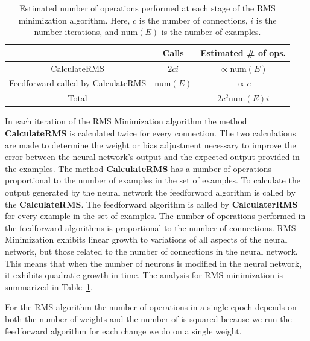 \documentclass[11pt]{article}
\begin{document}
\begin{table}
	\label{tab:RMSminimization}
	\begin{center}
		\begin{tabular}{ccc}
		\hline
		 & Calls & Estimated \# of ops.\\
		\hline
		CalculateRMS & $2ci$ & $\propto \mbox{num}(E)$\\
		Feedforward called by CalculateRMS & $\mbox{num}(E)$ & $\propto c$\\
		\hline
		Total &  & $2c^2\mbox{num}(E)i$\\
		\hline
		\end{tabular}	
	\end{center}
	\caption{Estimated number of operations performed at each stage of the RMS minimization algorithm. Here, $c$ is the number of connections, $i$ is the number iterations, and $\mbox{num}(E)$ is the number of examples.}
\end{table}

In each iteration of the RMS Minimization algorithm the method \textbf{CalculateRMS} is calculated twice for every connection. The two
calculations are made to determine the weight or bias adjustment necessary to improve the error between the neural network's output and
the expected output provided in the examples. The method \textbf{CalculateRMS} has a number of operations proportional to the number of
examples in the set of examples. To calculate the output generated by the neural network the feedforward algorithm is called by the
\textbf{CalculateRMS}. The feedforward algorithm is called by \textbf{CalculaterRMS} for every example in the set of examples. The
number of operations performed in the feedforward algorithms is proportional to the number of connections. RMS Minimization exhibits
linear growth to variations of all aspects of the neural network, but those related to the number of connections in the neural network.
This means that when the number of neurons is modified in the neural network, it exhibits quadratic growth in time. The analysis for RMS
minimization is summarized in Table~\ref{tab:RMSminimization}.

For the RMS algorithm the number of operations in a single epoch depends on both the number of weights and the number of is squared
because we run the feedforward algorithm for each change we do on a single weight.
\end{document}
